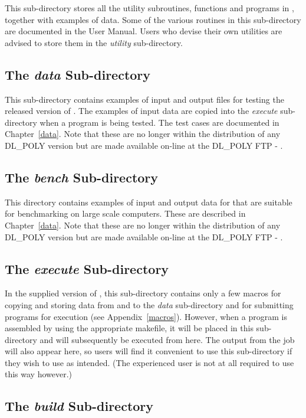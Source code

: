 This sub-directory stores all the utility subroutines, functions and
programs in \D, together with examples of data.  Some of the various
routines in this sub-directory are documented in the \C
User Manual.  Users who devise their own utilities are advised
to store them in the {\em utility} sub-directory.

\subsection{The {\em data} Sub-directory}

This sub-directory contains examples of input and output files for
testing the released version of \D.  The examples of input data
are copied into the {\em execute} sub-directory when a program is
being tested.  The test cases are documented in Chapter~\ref{data}.
Note that these are no longer within the distribution of any
DL\_POLY version but are made available on-line at the DL\_POLY FTP
- \FTP{}.

\subsection{The {\em bench} Sub-directory}

This directory contains examples of input and output data for \D
that are suitable for benchmarking \D on large scale computers.
These are described in Chapter~\ref{data}. Note that these are no
longer within the distribution of any DL\_POLY version but
are made available on-line at the DL\_POLY FTP - \FTP{}.

\subsection{The {\em execute} Sub-directory}

In the supplied version of \D, this sub-directory contains only a
few macros for copying and storing data from and to the {\em data}
sub-directory and for submitting programs for execution (see
Appendix~\ref{macros}).  However, when a \D program is assembled
by using the appropriate makefile, it will be placed in this
sub-directory and will subsequently be executed from here.
The output from the job will also appear here, so users will
find it convenient to use this sub-directory if they wish to
use \D as intended.  (The experienced user is not at all
required to use \D this way however.)

\subsection{The {\em build} Sub-directory}

